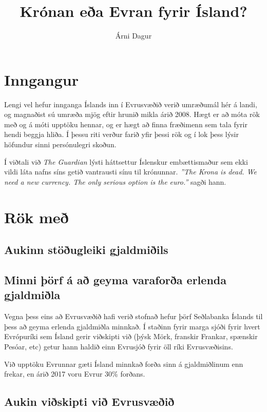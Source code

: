 \documentclass[a4paper]{article}
\title{Krónan eða Evran fyrir Ísland?}
\author{Árni Dagur}
\begin{document}
\maketitle

\section{Inngangur}

Lengi vel hefur innganga Íslands inn í Evrusvæðið verið umræðumál hér á landi, og magnaðist sú umræða mjög eftir hrunið mikla árið 2008. Hægt er að móta rök með og á móti upptöku hennar, og er hægt að finna fræðimenn sem tala fyrir hendi beggja hliða. Í þessu riti verður farið yfir þessi rök og í lok þess lýsir höfundur sinni persónulegri skoðun.

Í viðtali við \textit{The Guardian} lýsti háttsettur Íslenskur embættismaður sem ekki vildi láta nafns síns getið vantrausti sínu til krónunnar. \textit{''The Krona is dead. We need a new currency. The only serious option is the euro.''} sagði hann.\cite{traynor_2009}

\section{Rök með}

\subsection{Aukinn stöðugleiki gjaldmiðils}

\cite{icb_volatility_2008}

\subsection{Minni þörf á að geyma varaforða erlenda gjaldmiðla}

Vegna þess eins að Evrusvæðið hafi verið stofnað hefur þörf Seðlabanka Íslands til þess að geyma erlenda gjaldmiðla minnkað. Í staðinn fyrir marga sjóði fyrir hvert Evrópuríki sem Ísland gerir viðskipti við (þýsk Mörk, franskir Frankar, spænskir Pesóar, etc) getur hann haldið einn Evrusjóð fyrir öll ríki Evrusvæðisins.

Við upptöku Evrunnar gæti Ísland minnkað forða sinn á gjaldmiðlinum enn frekar\cite{saga_evropusamrunans}, en árið 2017 voru Evrur 30\% forðans.\cite{icb_annual_2017}

\subsection{Aukin viðskipti við Evrusvæðið}
\end{document}
